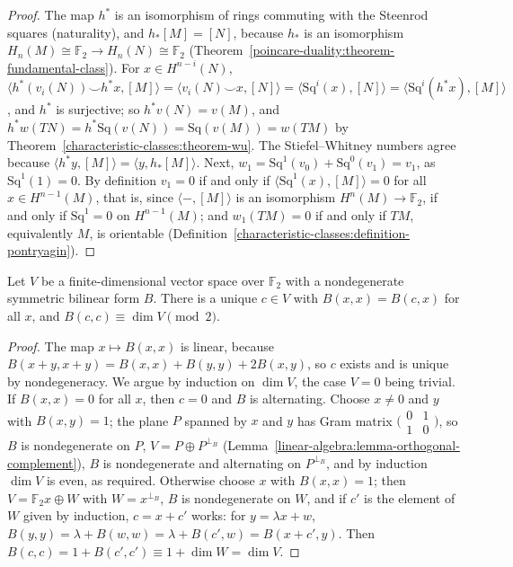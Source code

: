 \begin{proof}
The map $h^*$ is an isomorphism of rings commuting with the Steenrod squares (naturality), and $h_*[M] = [N]$, because $h_*$ is an isomorphism
$H_n(M) \cong \mathbb{F}_2 \to H_n(N) \cong \mathbb{F}_2$ (Theorem~\ref{poincare-duality:theorem-fundamental-class}). For $x \in H^{n-i}(N)$,
$\langle h^*(v_i(N)) \smile h^*x, [M]\rangle = \langle v_i(N) \smile x, [N]\rangle = \langle\mathrm{Sq}^i(x), [N]\rangle = \langle\mathrm{Sq}^i(h^*x), [M]\rangle$, and $h^*$ is
surjective; so $h^*v(N) = v(M)$, and $h^*w(TN) = h^*\mathrm{Sq}(v(N)) = \mathrm{Sq}(v(M)) = w(TM)$ by Theorem~\ref{characteristic-classes:theorem-wu}. The
Stiefel--Whitney numbers agree because $\langle h^*y, [M]\rangle = \langle y, h_*[M]\rangle$. Next, $w_1 = \mathrm{Sq}^1(v_0) + \mathrm{Sq}^0(v_1) = v_1$, as
$\mathrm{Sq}^1(1) = 0$. By definition $v_1 = 0$ if and only if $\langle\mathrm{Sq}^1(x), [M]\rangle = 0$ for all $x \in H^{n-1}(M)$, that is, since
$\langle -, [M]\rangle$ is an isomorphism $H^n(M) \to \mathbb{F}_2$, if and only if $\mathrm{Sq}^1 = 0$ on $H^{n-1}(M)$; and $w_1(TM) = 0$ if and only if $TM$,
equivalently $M$, is orientable (Definition~\ref{characteristic-classes:definition-pontryagin}).
\end{proof}

\begin{lemma}\label{characteristic-classes:lemma-characteristic-element}
Let $V$ be a finite-dimensional vector space over $\mathbb{F}_2$ with a nondegenerate symmetric bilinear form $B$. There is a unique $c \in V$ with
$B(x, x) = B(c, x)$ for all $x$, and $B(c, c) \equiv \dim V \pmod 2$.
\end{lemma}

\begin{proof}
The map $x \mapsto B(x, x)$ is linear, because $B(x + y, x + y) = B(x, x) + B(y, y) + 2B(x, y)$, so $c$ exists and is unique by nondegeneracy. We
argue by induction on $\dim V$, the case $V = 0$ being trivial. If $B(x, x) = 0$ for all $x$, then $c = 0$ and $B$ is alternating. Choose $x \neq 0$ and
$y$ with $B(x, y) = 1$; the plane $P$ spanned by $x$ and $y$ has Gram matrix $\bigl(\begin{smallmatrix}0 & 1\\ 1 & 0\end{smallmatrix}\bigr)$, so $B$ is
nondegenerate on $P$, $V = P \oplus P^{\perp_B}$ (Lemma~\ref{linear-algebra:lemma-orthogonal-complement}), $B$ is nondegenerate and alternating on
$P^{\perp_B}$, and by induction $\dim V$ is even, as required. Otherwise choose $x$ with $B(x, x) = 1$; then $V = \mathbb{F}_2x \oplus W$ with
$W = x^{\perp_B}$, $B$ is nondegenerate on $W$, and if $c'$ is the element of $W$ given by induction, $c = x + c'$ works: for $y = \lambda x + w$,
$B(y, y) = \lambda + B(w, w) = \lambda + B(c', w) = B(x + c', y)$. Then $B(c, c) = 1 + B(c', c') \equiv 1 + \dim W = \dim V$.
\end{proof}


